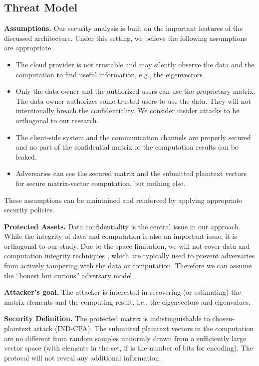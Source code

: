 \documentclass[10pt, conference, compsocconf]{IEEEtran}
\begin{document}
\subsection{Threat Model}

\textbf{Assumptions.} Our security analysis is built on the important features of the discussed architecture. Under this setting, we believe the following assumptions are appropriate. 
\begin{itemize}
\item The cloud provider is not trustable and may silently observe the data and the computation to find useful information, e.g., the eigenvectors.
\item Only the data owner and the authorized users can use the proprietary matrix. The data owner authorizes some trusted users to use the data. They will not intentionally breach the confidentiality. We consider insider attacks to be orthogonal to our research.\item The client-side system and the communication channels are properly secured and no part of the confidential matrix or the computation results can be leaked. 
\item Adversaries can see the secured matrix and the submitted plaintext vectors for secure matrix-vector computation, but nothing else.
\end{itemize}
These assumptions can be maintained and reinforced by applying appropriate security policies. 

\textbf{Protected Assets.} Data confidentiality is the central issue in our approach. While the integrity of data and computation is also an important issue, it is orthogonal to our study. Due to the space limitation, we will not cover data and computation integrity techniques \cite{wang11}, which are typically used to prevent adversaries from actively tampering with the data or computation. Therefore we can assume the ``honest but curious'' adversary model. 

\textbf{Attacker's goal.} The attacker is interested in recovering (or estimating) the matrix elements and the computing result, i.e., the eigenvectors and eigenvalues. 

\textbf{Security Definition.} The protected matrix is indistinguishable to chosen-plaintext attack (IND-CPA). The submitted plaintext vectors in the computation are no different from random samples uniformly drawn from a sufficiently large vector space (with  elements in the set, if  is the number of bits for encoding). The protocol will not reveal any additional information.  
\end{document}
